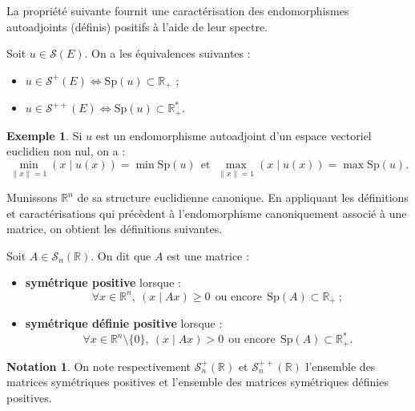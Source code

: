 \documentclass[french]{article}
\newcommand{\R}{\mathbb{R}}
\newcommand{\st}{^*}
\theoremstyle{plain}
\theoremstyle{definition}
\newtheorem*{ex}{Exemple}
\newtheorem*{notation}{Notation}
\theoremstyle{remark}
\begin{document}
La propriété suivante fournit une caractérisation des endomorphismes autoadjoints (définis) positifs à l'aide de leur spectre.

\begin{prop}
	Soit $u\in\mathcal{S}(E)$. On a les équivalences suivantes : 
	\begin{itemize}
		\item $u\in\mathcal{S}^+(E)\iff \text{Sp}(u)\subset\R_+$ ;
		\item $u\in\mathcal{S}^{++}(E)\iff \text{Sp}(u)\subset\R_+\st$.
	\end{itemize}
\end{prop}

\begin{ex}
	Si $u$ est un endomorphisme autoadjoint d'un espace vectoriel euclidien non nul, on a : $$\underset{\lVert x\rVert=1}{\min}(x\mid u(x))=\min\text{Sp}(u)\ \ \text{et}\ \ \underset{\lVert x\rVert=1}{\max}(x\mid u(x))=\max\text{Sp}(u).$$
\end{ex}

Munissons $\R^n$ de sa structure euclidienne canonique. En appliquant les définitions et caractérisations qui précèdent à l'endomorphisme canoniquement associé à une matrice, on obtient les définitions suivantes.

\begin{dfn}
	Soit $A\in\mathcal{S}_n(\R)$. On dit que $A$ est une matrice :
	\begin{itemize}
		\item \textbf{symétrique positive} lorsque : $$\forall x\in\R^n,\ (x\mid Ax)\geqslant 0\ \ \text{ou encore}\ \ \text{Sp}(A)\subset\R_+\ ;$$
		\item \textbf{symétrique définie positive} lorsque : $$\forall x\in\R^n\setminus\{0\},\ (x\mid Ax)> 0\ \ \text{ou encore}\ \ \text{Sp}(A)\subset\R_+\st.$$
	\end{itemize}
\end{dfn}

\begin{notation}
	On note respectivement $\mathcal{S}_n^+(\R)$ et $\mathcal{S}_n^{++}(\R)$ l'ensemble des matrices symétriques positives et l'ensemble des matrices symétriques définies positives.
\end{notation}
\end{document}
